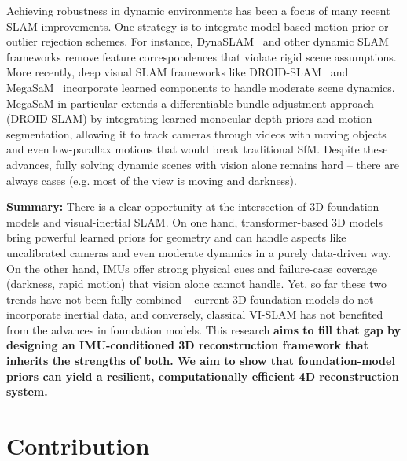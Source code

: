 Achieving robustness in dynamic environments has been a focus of many recent SLAM improvements. One strategy is to integrate model-based motion prior or outlier rejection schemes. For instance, DynaSLAM~\cite{bescos2018dynaslam} and other dynamic SLAM frameworks remove feature correspondences that violate rigid scene assumptions. More recently, deep visual SLAM frameworks like DROID-SLAM~\cite{teed2021droid} and MegaSaM~\cite{li2024megasam} incorporate learned components to handle moderate scene dynamics. MegaSaM in particular extends a differentiable bundle-adjustment approach (DROID-SLAM) by integrating learned monocular depth priors and motion segmentation, allowing it to track cameras through videos with moving objects and even low-parallax motions that would break traditional SfM. Despite these advances, fully solving dynamic scenes with vision alone remains hard – there are always cases (e.g. most of the view is moving and darkness).

\textbf{Summary:} There is a clear opportunity at the intersection of 3D foundation models and visual-inertial SLAM. On one hand, transformer-based 3D models bring powerful learned priors for geometry and can handle aspects like uncalibrated cameras and even moderate dynamics in a purely data-driven way. On the other hand, IMUs offer strong physical cues and failure-case coverage (darkness, rapid motion) that vision alone cannot handle. Yet, so far these two trends have not been fully combined – current 3D foundation models do not incorporate inertial data, and conversely, classical VI-SLAM has not benefited from the advances in foundation models. This research \textbf{aims to fill that gap by designing an IMU-conditioned 3D reconstruction framework that inherits the strengths of both. We aim to show that foundation-model priors can yield a resilient, computationally efficient 4D reconstruction system.}


\section{Contribution}

